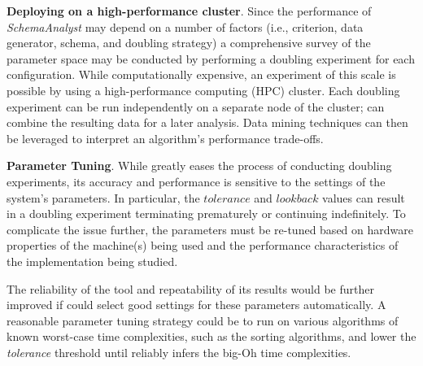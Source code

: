 

{\bf Deploying on a high-performance cluster}.  Since the performance of
\textit{SchemaAnalyst} may depend on a number of factors (i.e., criterion, data
generator, schema, and doubling strategy) a comprehensive survey of the
parameter space may be conducted by performing a doubling experiment for each
configuration. While computationally expensive, an experiment of this scale is
possible by using a high-performance computing (HPC) cluster. Each doubling
experiment can be run independently on a separate node of the cluster;
\toolname can combine the resulting data for a later analysis. Data mining techniques
can then be leveraged to interpret an algorithm's performance trade-offs.

 {\bf Parameter Tuning}.  While \toolname greatly eases the process of
 conducting doubling experiments, its accuracy and performance is sensitive to
 the settings of the system's parameters.  In particular, the
 $\mathit{tolerance}$ and $\mathit{lookback}$ values can result in a doubling
 experiment terminating prematurely or continuing indefinitely.  To complicate
 the issue further, the parameters must be re-tuned based on hardware
 properties of the machine(s) being used and the performance characteristics of
 the implementation being studied.

  The reliability of the tool and repeatability of its results would be further
  improved if \toolname could select good settings for these parameters
  automatically. A reasonable parameter tuning strategy could be to run
  \toolname on various algorithms of known worst-case time complexities, such
  as the sorting algorithms, and lower the \textit{tolerance} threshold until
  \toolname reliably infers the big-Oh time complexities.

